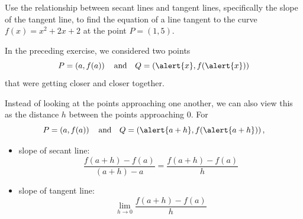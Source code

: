 \documentclass[cal1spr16Lectures.tex]{subfiles}
\begin{document}
\begin{frame}
\begin{exe} Use the relationship between secant lines and tangent lines, specifically the slope of the tangent line, to find the equation of a line tangent to the curve $f(x)=x^2+2x+2$ at the point $P=(1,5)$.
\end{exe}
\end{frame}

\begin{frame}{}
In the preceding exercise, we considered two points 
\vspace{-0.6pc}
\[P=\left(a,f(a)\right)\quad\text{and}\quad Q=\left(\alert{x},f(\alert{x})\right)\]
that were getting closer and closer together.

\vspace{2pc}
Instead of looking at the points approaching one another, we can also view this as the distance $h$ between the points approaching 0.  For 
\vspace{-0.5pc}
\[P=\left(a,f(a)\right)\quad\text{and}\quad Q=\left(\alert{a+h},f(\alert{a+h})\right),\]
\end{frame}

\begin{frame}
\begin{itemize}
\item slope of secant line:  
\[\frac{f(a+h)-f(a)}{(a+h)-a}= \dfrac{f(a+h)-f(a)}{h}\]
\item slope of tangent line:  
\[\lim_{h \to 0} \frac{f(a+h)-f(a)}{h}\]
\end{itemize}
\end{frame}

\begin{frame}
\end{frame}
\end{document}
